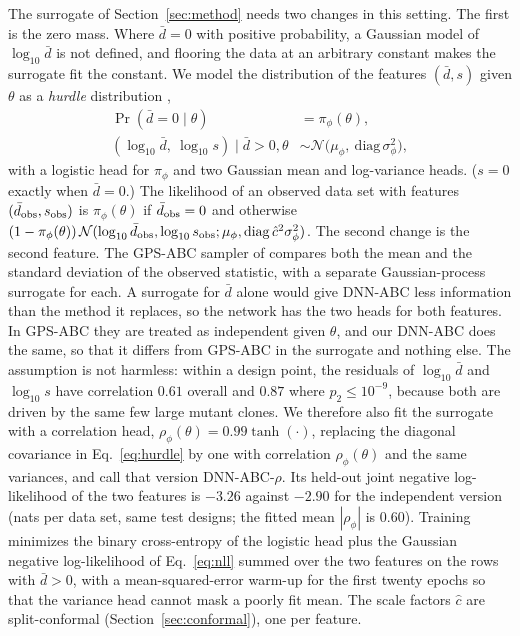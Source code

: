 \documentclass[sn-basic,iicol,pdflatex]{sn-jnl}
\begin{document}
The surrogate of Section~\ref{sec:method} needs two changes in this setting. The first is
the zero mass. Where $\bar d=0$ with positive probability, a Gaussian model of
$\log_{10}\bar d$ is not defined, and flooring the data at an arbitrary constant
makes the surrogate fit the constant. We model the distribution of the features
$(\bar d,s)$ given $\theta$ as a \emph{hurdle} distribution \citep{cragg1971,mullahy1986},
\begin{equation}
\label{eq:hurdle}
\begin{split}
\Pr(\bar d=0\mid\theta)&=\pi_\phi(\theta),\\
(\log_{10}\bar d,\ \log_{10}s)\mid\bar d>0,\theta&\sim
\mathcal N\!\big(\mu_\phi,\ \mathrm{diag}\,\sigma^2_\phi\big),
\end{split}
\end{equation}
with a logistic head for $\pi_\phi$ and two Gaussian mean and log-variance
heads. ($s=0$ exactly when $\bar d=0$.) The likelihood of an observed data set
with features $(\bar d_{\rm obs},s_{\rm obs})$ is $\pi_\phi(\theta)$ if
$\bar d_{\rm obs}=0$ and otherwise
$(1-\pi_\phi(\theta))\,\mathcal N(\log_{10}\bar d_{\rm obs},\log_{10}s_{\rm obs};\mu_\phi,\mathrm{diag}\,\hat c^2\sigma_\phi^2)$.
The second change is the second feature. The GPS-ABC sampler of
\citeauthor{lu2023} compares both the mean and the standard deviation of the
observed statistic, with a separate Gaussian-process surrogate for each. A
surrogate for $\bar d$ alone would give DNN-ABC less information than the
method it replaces, so the network has the two heads for both features. In
GPS-ABC they are treated as independent given $\theta$, and our DNN-ABC does the
same, so that it differs from GPS-ABC in the surrogate and nothing else. The
assumption is not harmless: within a design point, the residuals of
$\log_{10}\bar d$ and $\log_{10}s$ have correlation $0.61$ overall and $0.87$ where
$p_2\le10^{-9}$, because both are driven by the same few large mutant clones. We
therefore also fit the surrogate with a correlation head,
$\rho_\phi(\theta)=0.99\tanh(\cdot)$, replacing the diagonal covariance in
Eq.~\eqref{eq:hurdle} by one with correlation $\rho_\phi(\theta)$ and the same variances, and call
that version DNN-ABC-$\rho$. Its held-out joint negative log-likelihood of the two features is $-3.26$
against $-2.90$ for the independent version (nats per data set, same test designs; the
fitted mean $|\rho_\phi|$ is $0.60$). Training minimizes the binary
cross-entropy of the logistic head plus the Gaussian negative log-likelihood of
Eq.~\eqref{eq:nll} summed over the two features on the rows with $\bar d>0$,
with a mean-squared-error warm-up for the first twenty epochs so that the
variance head cannot mask a poorly fit mean. The scale factors $\hat c$ are
split-conformal (Section~\ref{sec:conformal}), one per feature.
\end{document}
